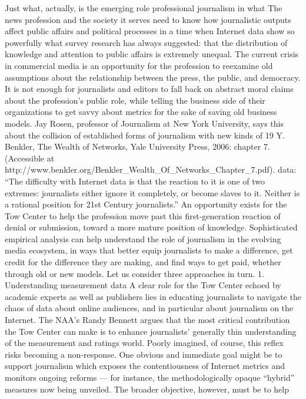 Just what, actually, is the emerging role professional journalism in what
The news profession and the society it serves need to know how
journalistic outputs affect public affairs and political processes in a time
when Internet data show so powerfully what survey research has always
suggested: that the distribution of knowledge and attention to public
affairs is extremely unequal. The current crisis in commercial media is an
opportunity for the profession to reexamine old assumptions about the
relationship between the press, the public, and democracy. It is not
enough for journalists and editors to fall back on abstract moral claims
about the profession’s public role, while telling the business side of their
organizations to get savvy about metrics for the sake of saving old
business models.
Jay Rosen, professor of Journalism at New York University, says this
about the collision of established forms of journalism with new kinds of
19 Y. Benkler, The Wealth of Networks, Yale University Press, 2006:
chapter 7. (Accessible at
http://www.benkler.org/Benkler_Wealth_Of_Networks_Chapter_7.pdf).
data: ``The difficulty with Internet data is that the reaction to it is one of
two extremes: journalists either ignore it completely, or become slaves to
it. Neither is a rational position for 21st Century journalists.''
An opportunity exists for the Tow Center to help the profession move past
this first‐generation reaction of denial or submission, toward a more
mature position of knowledge. Sophisticated empirical analysis can help
understand the role of journalism in the evolving media ecosystem, in
ways that better equip journalists to make a difference, get credit for the
difference they are making, and find ways to get paid, whether through
old or new models. Let us consider three approaches in turn.
1. Understanding measurement data
A clear role for the Tow Center echoed by academic experts as well as
publishers lies in educating journalists to navigate the chaos of data about
online audiences, and in particular about journalism on the Internet. The
NAA’s Randy Bennett argues that the most critical contribution the Tow
Center can make is to enhance journalists’ generally thin understanding of
the measurement and ratings world.
Poorly imagined, of course, this reflex risks becoming a non‐response.
One obvious and immediate goal might be to support journalism which
exposes the contentiousness of Internet metrics and monitors ongoing
reforms — for instance, the methodologically opaque ``hybrid'' measures
now being unveiled. The broader objective, however, must be to help
